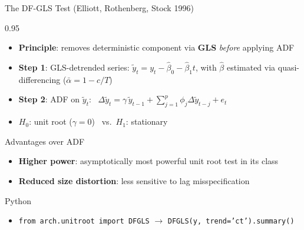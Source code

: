 \documentclass[9pt, aspectratio=169, t]{beamer}
\begin{document}
\begin{frame}{The DF-GLS Test (Elliott, Rothenberg, Stock 1996)}
    \begin{cminipage}{0.95\textwidth}
        \vspace{-0.3cm}
        {\footnotesize
        \begin{defn}
            \begin{itemize}\setlength{\itemsep}{0pt}
                \item \textbf{Principle}: removes deterministic component via \textbf{GLS} \textit{before} applying ADF
                \item \textbf{Step 1}: GLS-detrended series: $\tilde{y}_t = y_t - \hat{\beta}_0 - \hat{\beta}_1 t$, with $\hat{\beta}$ estimated via quasi-differencing ($\bar{\alpha} = 1 - c/T$)
                \item \textbf{Step 2}: ADF on $\tilde{y}_t$: \ $\Delta \tilde{y}_t = \gamma\, \tilde{y}_{t-1} + \sum_{j=1}^{p} \phi_j \Delta \tilde{y}_{t-j} + e_t$
                \item $H_0$: unit root ($\gamma = 0$) \ vs.\ $H_1$: stationary
            \end{itemize}
        \end{defn}
        \vspace{-1mm}
        \begin{block}{Advantages over ADF}
            \begin{itemize}\setlength{\itemsep}{0pt}
                \item \textbf{Higher power}: asymptotically most powerful unit root test in its class
                \item \textbf{Reduced size distortion}: less sensitive to lag misspecification
            \end{itemize}
        \end{block}
        \vspace{-1mm}
        \begin{exampleblock}{Python}
            \begin{itemize}\setlength{\itemsep}{0pt}
                \item \texttt{from arch.unitroot import DFGLS} \quad $\rightarrow$ \quad \texttt{DFGLS(y, trend='ct').summary()}
            \end{itemize}
        \end{exampleblock}
        }
    \end{cminipage}
\end{frame}
\end{document}
